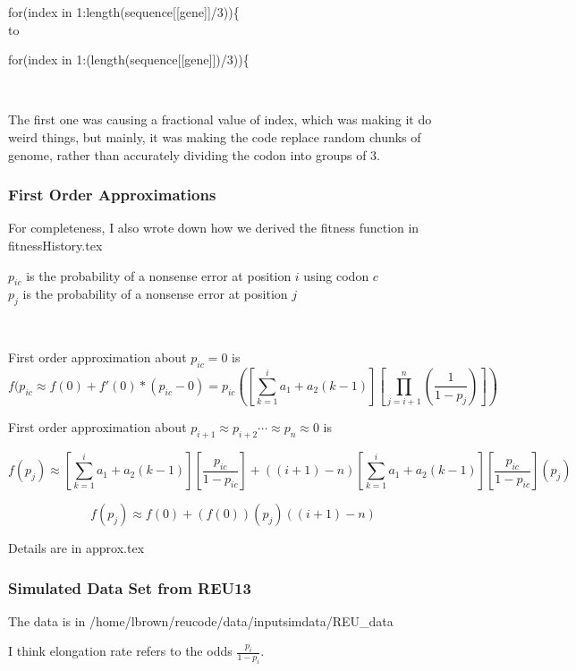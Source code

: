 for(index in 1:length(sequence[[gene]]/3))\{
\\to

for(index in 1:(length(sequence[[gene]])/3))\{

~

The first one was causing a fractional value of index, which was making it do weird things, but mainly, it was making the code replace random chunks of genome, rather than accurately dividing the codon into groups of 3.


\subsubsection{First Order Approximations}

For completeness, I also wrote down how we derived the fitness function in fitnessHistory.tex


$p_{ic}$ is the probability of a nonsense error at position $i$ using codon $c$
\\ $p_j$ is the probability of a nonsense error at position $j$

~

First order approximation about $p_{ic} = 0$ is
$$f(p_{ic} \approx f(0) + f'(0)*(p_{ic}-0)
= p_{ic}\left(
\left[\sum_{k=1}^{i} a_1 + a_2(k-1)\right]
\left[\prod_{j=i+1}^{n}(\frac{1}{1-p_{j}})\right]
\right)
$$


First order approximation about $p_{i+1} \approx p_{i+2} \cdots \approx p_{n} \approx 0$ is

$$
f(p_j) \approx
\left[\sum_{k=1}^{i} a_1 + a_2(k-1)\right]
\left[\frac{p_{ic}}{1-p_{ic}}\right]
+
\left( (i+1) - n \right)
\left[\sum_{k=1}^{i} a_1 + a_2(k-1)\right]
\left[\frac{p_{ic}}{1-p_{ic}}\right]
\left( p_{j} \right)
$$

$$
f(p_j) \approx
f(0) + (f(0))(p_j)((i+1)-n)
$$


Details are in approx.tex


\subsubsection{Simulated Data Set from REU13}
The data is in /home/lbrown/reucode/data/inputsimdata/REU\_data

I think elongation rate refers to the odds $\frac{p_i}{1-p_i}$.



